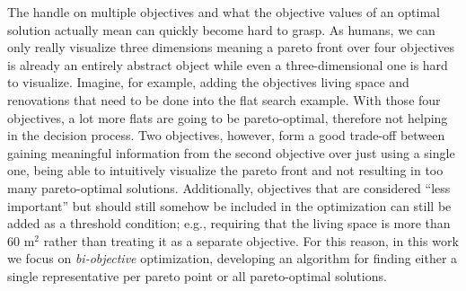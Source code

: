 
The handle on multiple objectives and what the objective values of an optimal solution actually mean can quickly become hard to grasp.
As humans, we can only really visualize three dimensions meaning a pareto front over four objectives is already an entirely abstract object while even a three-dimensional one is hard to visualize.
Imagine, for example, adding the objectives living space and renovations that need to be done into the flat search example.
With those four objectives, a lot more flats are going to be pareto-optimal, therefore not helping in the decision process.
Two objectives, however, form a good trade-off between gaining meaningful information from the second objective over just using a single one, being able to intuitively visualize the pareto front and not resulting in too many pareto-optimal solutions.
Additionally, objectives that are considered ``less important'' but should still somehow be included in the optimization can still be added as a threshold condition;
e.g., requiring that the living space is more than 60 $\text{m}^2$ rather than treating it as a separate objective.
For this reason, in this work we focus on \emph{bi-objective} optimization, developing an algorithm for finding either a single representative per pareto point or all pareto-optimal solutions.

\TODO{\lipsum[6-6]}

\TODO{\lipsum[7-7]}

\TODO{\lipsum[7-7]}

\TODO{\lipsum[8-8]}

\TODO{\lipsum[9-9]}

\TODO{\lipsum[10-10]}

\TODO{\lipsum[11-11]}

\TODO{\lipsum[12-12]}